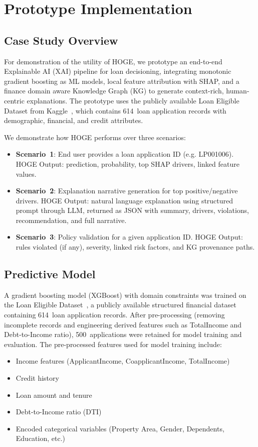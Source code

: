 \documentclass[lnbip]{svmultln}
\begin{document}
\section{Prototype Implementation}

\subsection{Case Study Overview}
For demonstration of the utility of HOGE, we prototype an end-to-end Explainable AI (XAI) pipeline for loan decisioning, integrating monotonic gradient boosting as ML models, local feature attribution with SHAP, and a finance domain aware Knowledge Graph (KG) to generate context-rich, human-centric explanations. The prototype uses the publicly available Loan Eligible Dataset from Kaggle~\cite{kaggle_loan}, which contains 614~loan application records with demographic, financial, and credit attributes.

We demonstrate how HOGE performs over three scenarios:
\begin{itemize}
    \item \textbf{Scenario~1}: End user provides a loan application ID (e.g. LP001006). HOGE Output: prediction, probability, top SHAP drivers, linked feature values.
    \item \textbf{Scenario~2}: Explanation narrative generation for top positive/negative drivers. HOGE Output: natural language explanation using structured prompt through LLM, returned as JSON with summary, drivers, violations, recommendation, and full narrative.
    \item \textbf{Scenario~3}: Policy validation for a given application ID. HOGE Output: rules violated (if any), severity, linked risk factors, and KG provenance paths.
\end{itemize}


\subsection{Predictive Model}
A gradient boosting model (XGBoost) with domain constraints was trained on the Loan Eligible Dataset~\cite{kaggle_loan}, a publicly available structured financial dataset containing 614~loan application records. After pre-processing (removing incomplete records and engineering derived features such as TotalIncome and Debt-to-Income ratio), 500~applications were retained for model training and evaluation. The pre-processed features used for model training include:
\begin{itemize}
    \item Income features (ApplicantIncome, CoapplicantIncome, TotalIncome)
    \item Credit history
    \item Loan amount and tenure
    \item Debt-to-Income ratio (DTI)
    \item Encoded categorical variables (Property Area, Gender, Dependents, Education, etc.)
\end{itemize}
\end{document}
